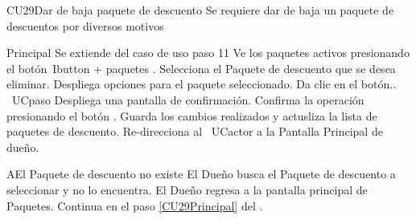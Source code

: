 \begin{UseCase}{CU29}{Dar de baja paquete de descuento}{
		Se requiere dar de baja un paquete de descuentos por diversos motivos
	}
	\end{UseCase}
	\begin{UCtrayectoria}{Principal}
		\UCpaso Se extiende del caso de uso  paso 11
		\UCpaso[\UCactor] Ve los paquetes activos presionando el botón\ Ibutton {+ paquetes } .
		\UCpaso[\UCactor] Selecciona el Paquete de descuento que se desea eliminar. 
		\UCpaso Despliega opciones para el paquete seleccionado.
		\UCpaso [\UCactor] Da clic en el botón..
		\ UCpaso Despliega una pantalla de confirmación.
		\UCpaso[\UCactor] Confirma la operación presionando el botón .
		\UCpaso Guarda los cambios realizados y actusliza la lista de paquetes de descuento.
		\UCpaso Re-direcciona al \ UCactor a la    {Pantalla Principal de dueño}.
	
	\end{UCtrayectoria}


		\begin{UCtrayectoriaA}{A}{El Paquete de descuento no existe}
			\UCpaso[\UCactor] El Dueño busca el Paquete de descuento a seleccionar y no lo encuentra.
			\UCpaso[\UCactor] El Dueño regresa a la pantalla principal de Paquetes.
			\UCpaso Continua en el paso \ref{CU29Principal} del .
		\end{UCtrayectoriaA}

